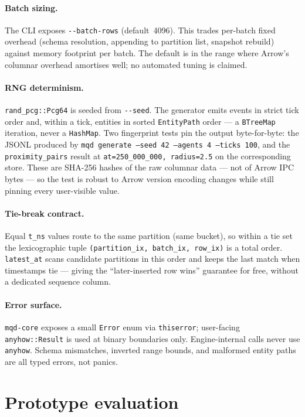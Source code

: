 \documentclass[11pt]{article}
\begin{document}
\paragraph{Batch sizing.} The CLI exposes \texttt{-{}-batch-rows} (default~4096). This
trades per-batch fixed overhead (schema resolution, appending to partition list,
snapshot rebuild) against memory footprint per batch. The default is in the range where
Arrow's columnar overhead amortises well; no automated tuning is claimed.

\paragraph{RNG determinism.} \texttt{rand\_pcg::Pcg64} is seeded from \texttt{-{}-seed}.
The generator emits events in strict tick order and, within a tick, entities in sorted
\texttt{EntityPath} order --- a \texttt{BTreeMap} iteration, never a
\texttt{HashMap}. Two fingerprint tests pin the output byte-for-byte: the JSONL
produced by \texttt{mqd generate --seed 42 --agents 4 --ticks 100}, and the
\texttt{proximity\_pairs} result at \texttt{at=250\_000\_000, radius=2.5} on the
corresponding store. These are SHA-256 hashes of the raw columnar data --- not of
Arrow IPC bytes --- so the test is robust to Arrow version encoding changes while
still pinning every user-visible value.

\paragraph{Tie-break contract.} Equal \texttt{t\_ns} values route to the same partition
(same bucket), so within a tie set the lexicographic tuple
\texttt{(partition\_ix, batch\_ix, row\_ix)} is a total order. \texttt{latest\_at}
scans candidate partitions in this order and keeps the last match when timestamps
tie --- giving the ``later-inserted row wins'' guarantee for free, without a dedicated
sequence column.

\paragraph{Error surface.} \texttt{mqd-core} exposes a small \texttt{Error} enum via
\texttt{thiserror}; user-facing \texttt{anyhow::Result} is used at binary boundaries
only. Engine-internal calls never use \texttt{anyhow}. Schema mismatches, inverted
range bounds, and malformed entity paths are all typed errors, not panics.

\section{Prototype evaluation}
\end{document}
